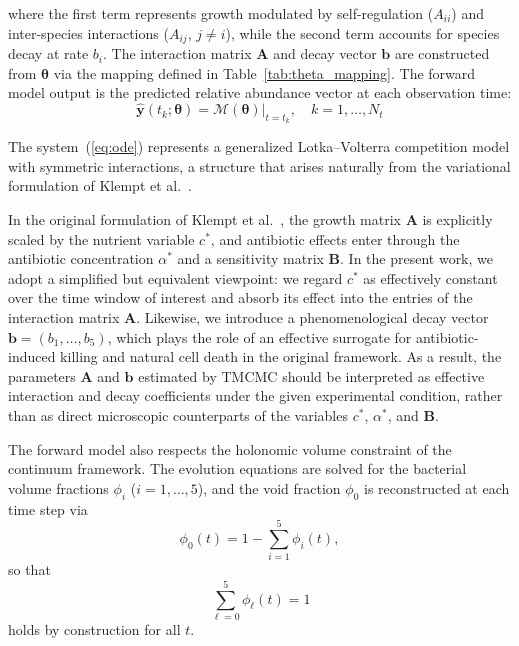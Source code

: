 \documentclass[11pt,a4paper]{article}
\begin{document}
\noindent where the first term represents growth modulated by self-regulation ($A_{ii}$) and inter-species interactions ($A_{ij}$, $j \neq i$), while the second term accounts for species decay at rate $b_i$. The interaction matrix $\mathbf{A}$ and decay vector $\mathbf{b}$ are constructed from $\boldsymbol{\theta}$ via the mapping defined in Table~\ref{tab:theta_mapping}. The forward model output is the predicted relative abundance vector at each observation time:
\begin{equation}
\hat{\mathbf{y}}(t_k; \boldsymbol{\theta}) = \mathcal{M}(\boldsymbol{\theta})\big|_{t=t_k}, \quad k = 1, \ldots, N_t
\end{equation}

\noindent The system~(\ref{eq:ode}) represents a generalized Lotka--Volterra competition model with symmetric interactions, a structure that arises naturally from the variational formulation of Klempt et al.~\cite{Klempt2025ContinuumBiofilm}.

In the original formulation of Klempt et al.~\cite{Klempt2025ContinuumBiofilm}, the growth matrix $\mathbf{A}$ is explicitly scaled by the nutrient variable $c^*$, and antibiotic effects enter through the antibiotic concentration $\alpha^*$ and a sensitivity matrix $\mathbf{B}$. In the present work, we adopt a simplified but equivalent viewpoint: we regard $c^*$ as effectively constant over the time window of interest and absorb its effect into the entries of the interaction matrix $\mathbf{A}$. Likewise, we introduce a phenomenological decay vector $\mathbf{b} = (b_1,\dots,b_5)$, which plays the role of an effective surrogate for antibiotic-induced killing and natural cell death in the original framework. As a result, the parameters $\mathbf{A}$ and $\mathbf{b}$ estimated by TMCMC should be interpreted as effective interaction and decay coefficients under the given experimental condition, rather than as direct microscopic counterparts of the variables $c^*$, $\alpha^*$, and $\mathbf{B}$.

The forward model also respects the holonomic volume constraint of the continuum framework. The evolution equations are solved for the bacterial volume fractions $\phi_i$ ($i = 1,\dots,5$), and the void fraction $\phi_0$ is reconstructed at each time step via
\begin{equation}
  \phi_0(t) = 1 - \sum_{i=1}^5 \phi_i(t),
\end{equation}
so that
\begin{equation}
  \sum_{\ell=0}^5 \phi_\ell(t) = 1
\end{equation}
holds by construction for all $t$.
\end{document}
